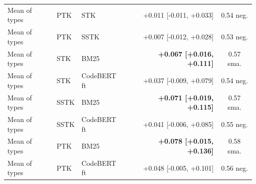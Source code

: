 \begin{table}[!htbp]
\begin{tabular}{lllrc}
Mean of types & PTK & STK & +0.011 [-0.011, +0.033] & 0.54 neg. \\
Mean of types & PTK & SSTK & +0.007 [-0.012, +0.028] & 0.53 neg. \\
Mean of types & STK & BM25 & \textbf{+0.067 [+0.016, +0.111]} & 0.57 sma. \\
Mean of types & STK & CodeBERT ft & +0.037 [-0.009, +0.079] & 0.54 neg. \\
Mean of types & SSTK & BM25 & \textbf{+0.071 [+0.019, +0.115]} & 0.57 sma. \\
Mean of types & SSTK & CodeBERT ft & +0.041 [-0.006, +0.085] & 0.55 neg. \\
Mean of types & PTK & BM25 & \textbf{+0.078 [+0.015, +0.136]} & 0.58 sma. \\
Mean of types & PTK & CodeBERT ft & +0.048 [-0.005, +0.101] & 0.56 neg. \\
\bottomrule
\end{tabular}
\end{table}
